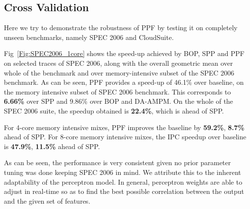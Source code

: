 \subsection{Cross Validation}
\label{Results-CrossVal}

Here we try to demonstrate the robustness of PPF by testing it on
completely unseen benchmarks, namely SPEC 2006 and CloudSuite.

Fig~\ref{Fig:SPEC2006_1core} shows the speed-up achieved by BOP, SPP and PPF on
selected traces of SPEC 2006, along with the overall geometric mean
over whole of the benchmark and over memory-intensive subset of the
SPEC 2006 benchmark.  As can be seen, PPF provides a speed-up of
46.1\% over baseline, on the memory intensive subset of SPEC 2006
benchmark. This corresponds to \textbf{6.66\%} over SPP and {9.86\%} over BOP and DA-AMPM.  
On the whole of the SPEC 2006 suite, the speedup obtained is \textbf{22.4\%},
which is  ahead of SPP.

For 4-core memory intensive mixes, PPF improves the baseline by \textbf{59.2\%}, 
\textbf{8.7\%} ahead of SPP. For 8-core memory intensive mixes, the IPC speedup 
over baseline is \textbf{47.9\%}, \textbf{11.5\%} ahead of SPP. 

As can be seen, the performance is very consistent given no prior
parameter tuning was done keeping SPEC 2006 in mind.  We attribute
this to the inherent adaptability of the perceptron model.  In
general, perceptron weights are able to adjust in real-time so as to
find the best possible correlation between the output and the given set of 
features.
